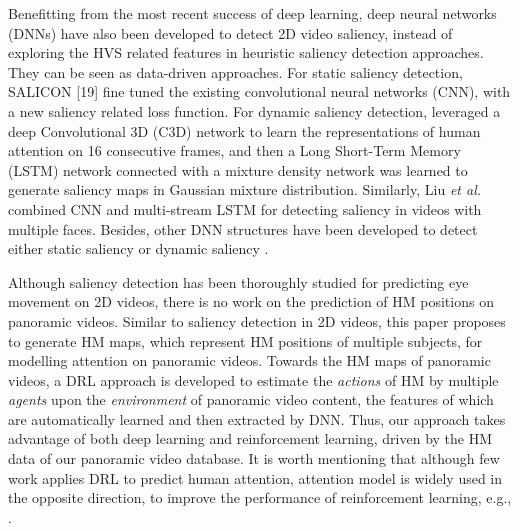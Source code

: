 \documentclass[10pt,journal,compsoc]{IEEEtran}
\begin{document}
Benefitting from the most recent success of deep learning, deep neural networks (DNNs) \cite{huang2015salicon, kruthiventi2015deepfix, wang2016RCNN, bazzani2016recurrent, Liu2017cvpr, bak2016two,wang2017deep} have also been  developed to detect 2D video saliency, instead of exploring the HVS related features in heuristic saliency detection approaches. They can be seen as data-driven approaches. For static saliency detection, SALICON [19] fine tuned the existing convolutional neural networks (CNN), with a new saliency related loss function. For dynamic saliency detection, \cite{bazzani2016recurrent} leveraged a deep Convolutional 3D (C3D) network to learn the representations of human attention on 16 consecutive frames, and then a Long Short-Term Memory (LSTM) network connected with a mixture density network was learned to generate saliency maps in Gaussian mixture distribution. Similarly, Liu \textit{et al.} \cite{Liu2017cvpr} combined CNN and multi-stream LSTM for detecting saliency in videos with multiple faces. Besides, other DNN structures have been developed to detect either static saliency \cite{kruthiventi2015deepfix, wang2016RCNN} or dynamic saliency \cite{bak2016two,bazzani2016recurrent,wang2017deep}.


Although saliency detection has been thoroughly studied for predicting eye movement on 2D videos, there is no work on the prediction of HM positions on panoramic videos.
Similar to saliency detection in 2D videos, this paper proposes to generate HM maps, which represent HM positions of multiple subjects, for modelling attention on panoramic videos. Towards the HM maps of panoramic videos, a DRL approach is developed to estimate the \textit{actions} of HM by multiple \textit{agents} upon the \textit{environment} of panoramic video content, the features of which are automatically learned and then extracted by DNN. Thus, our approach takes advantage of both deep learning and reinforcement learning, driven by the HM data of our panoramic video database.
It is worth mentioning that although few work applies DRL to predict human attention, attention model is widely used in the opposite direction, to improve the performance of reinforcement learning, e.g., \cite{minut2001reinforcement, mnih2014recurrent, jaderberg2016reinforcement, wang2016dueling}.
\end{document}
